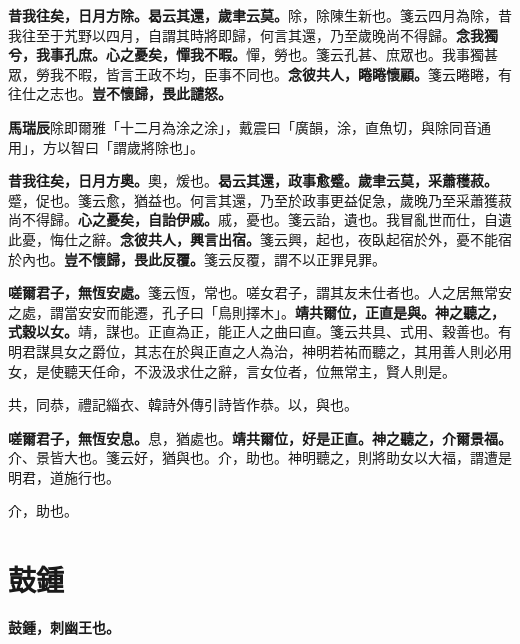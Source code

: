 \textbf{昔我往矣，日月方除。曷云其還，歲聿云莫。}{\footnotesize 除，除陳生新也。箋云四月為除，昔我往至于艽野以四月，自謂其時將即歸，何言其還，乃至歲晚尚不得歸。}\textbf{念我獨兮，我事孔庶。心之憂矣，憚我不暇。}{\footnotesize 憚，勞也。箋云孔甚、庶眾也。我事獨甚眾，勞我不暇，皆言王政不均，臣事不同也。}\textbf{念彼共人，睠睠懷顧。}{\footnotesize 箋云睠睠，有往仕之志也。}\textbf{豈不懷歸，畏此譴怒。}

\begin{quoting}\textbf{馬瑞辰}除即爾雅「十二月為涂之涂」，戴震曰「廣韻，涂，直魚切，與除同音通用」，方以智曰「謂歲將除也」。\end{quoting}

\textbf{昔我往矣，日月方奧。}{\footnotesize 奧，煖也。}\textbf{曷云其還，政事愈蹙。歲聿云莫，采蕭穫菽。}{\footnotesize 蹙，促也。箋云愈，猶益也。何言其還，乃至於政事更益促急，歲晚乃至采蕭獲菽尚不得歸。}\textbf{心之憂矣，自詒伊戚。}{\footnotesize 戚，憂也。箋云詒，遺也。我冒亂世而仕，自遺此憂，悔仕之辭。}\textbf{念彼共人，興言出宿。}{\footnotesize 箋云興，起也，夜臥起宿於外，憂不能宿於內也。}\textbf{豈不懷歸，畏此反覆。}{\footnotesize 箋云反覆，謂不以正罪見罪。}

\textbf{嗟爾君子，無恆安處。}{\footnotesize 箋云恆，常也。嗟女君子，謂其友未仕者也。人之居無常安之處，謂當安安而能遷，孔子曰「鳥則擇木」。}\textbf{靖共爾位，正直是與。神之聽之，式穀以女。}{\footnotesize 靖，謀也。正直為正，能正人之曲曰直。箋云共具、式用、穀善也。有明君謀具女之爵位，其志在於與正直之人為治，神明若祐而聽之，其用善人則必用女，是使聽天任命，不汲汲求仕之辭，言女位者，位無常主，賢人則是。}

\begin{quoting}共，同恭，禮記緇衣、韓詩外傳引詩皆作恭。以，與也。\end{quoting}

\textbf{嗟爾君子，無恆安息。}{\footnotesize 息，猶處也。}\textbf{靖共爾位，好是正直。神之聽之，介爾景福。}{\footnotesize 介、景皆大也。箋云好，猶與也。介，助也。神明聽之，則將助女以大福，謂遭是明君，道施行也。}

\begin{quoting}介，助也。\end{quoting}

\section{鼓鍾}


\textbf{鼓鍾，刺幽王也。}

